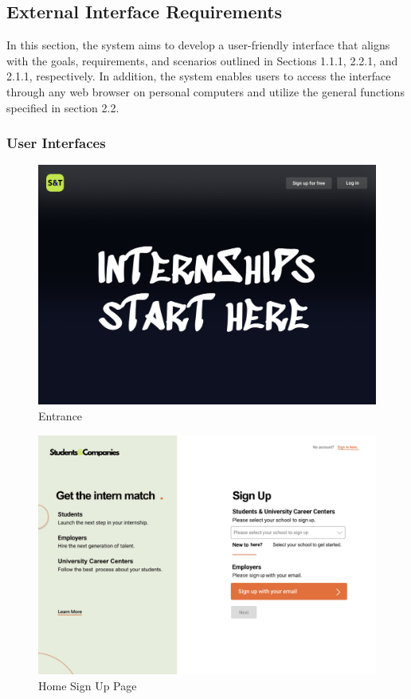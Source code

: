 \documentclass[a4paper,12pt]{article}
\begin{document}
\subsection{External Interface Requirements}
In this section, the system aims to develop a user-friendly interface that aligns with the goals, requirements, and scenarios outlined in Sections 1.1.1, 2.2.1, and 2.1.1, respectively. In addition, the system enables users to access the interface through any web browser on personal computers and utilize the general functions specified in section 2.2.
\subsubsection{User Interfaces}
\begin{figure}[H]
    \centering
    \includegraphics[scale = 0.40]{figures/UserInterfaces/General/Entrance.png}
    \caption{Entrance}
    \centering
\end{figure}
\begin{figure}[H]
    \centering
    \includegraphics[scale = 0.40]{figures/UserInterfaces/General/HomeSignUp.png}
    \caption{Home Sign Up Page}
    \centering
\end{figure}
\end{document}

